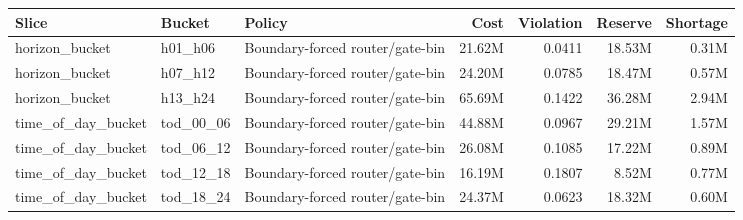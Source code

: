\begin{tabular}{lllrrrr}
\toprule
Slice & Bucket & Policy & Cost & Violation & Reserve & Shortage \\
\midrule
horizon\_bucket & h01\_h06 & Boundary-forced router/gate-bin & 21.62M & 0.0411 & 18.53M & 0.31M \\
horizon\_bucket & h07\_h12 & Boundary-forced router/gate-bin & 24.20M & 0.0785 & 18.47M & 0.57M \\
horizon\_bucket & h13\_h24 & Boundary-forced router/gate-bin & 65.69M & 0.1422 & 36.28M & 2.94M \\
time\_of\_day\_bucket & tod\_00\_06 & Boundary-forced router/gate-bin & 44.88M & 0.0967 & 29.21M & 1.57M \\
time\_of\_day\_bucket & tod\_06\_12 & Boundary-forced router/gate-bin & 26.08M & 0.1085 & 17.22M & 0.89M \\
time\_of\_day\_bucket & tod\_12\_18 & Boundary-forced router/gate-bin & 16.19M & 0.1807 & 8.52M & 0.77M \\
time\_of\_day\_bucket & tod\_18\_24 & Boundary-forced router/gate-bin & 24.37M & 0.0623 & 18.32M & 0.60M \\
\bottomrule
\end{tabular}
